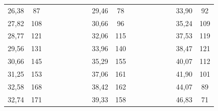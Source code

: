 \begin{enumerate}
\begin{table}[h!]
{\begin{tabular}{|cc|cccccccccccccccc}
					\multicolumn{1}{|c|}{26,38}    & 87                &  &  &  &  &  & \multicolumn{1}{c|}{} & \multicolumn{1}{c|}{29,46}    & \multicolumn{1}{c|}{78}                &  &  &  &  &  & \multicolumn{1}{c|}{} & \multicolumn{1}{c|}{33,90}    & \multicolumn{1}{c|}{92}                \\ \cline{1-2} \cline{9-10} \cline{17-18} 
					\multicolumn{1}{|c|}{27,82}    & 108               &  &  &  &  &  & \multicolumn{1}{c|}{} & \multicolumn{1}{c|}{30,66}    & \multicolumn{1}{c|}{96}                &  &  &  &  &  & \multicolumn{1}{c|}{} & \multicolumn{1}{c|}{35,24}    & \multicolumn{1}{c|}{109}               \\ \cline{1-2} \cline{9-10} \cline{17-18} 
					\multicolumn{1}{|c|}{28,77}    & 121               &  &  &  &  &  & \multicolumn{1}{c|}{} & \multicolumn{1}{c|}{32,06}    & \multicolumn{1}{c|}{115}               &  &  &  &  &  & \multicolumn{1}{c|}{} & \multicolumn{1}{c|}{37,53}    & \multicolumn{1}{c|}{119}               \\ \cline{1-2} \cline{9-10} \cline{17-18} 
					\multicolumn{1}{|c|}{29,56}    & 131               &  &  &  &  &  & \multicolumn{1}{c|}{} & \multicolumn{1}{c|}{33,96}    & \multicolumn{1}{c|}{140}               &  &  &  &  &  & \multicolumn{1}{c|}{} & \multicolumn{1}{c|}{38,47}    & \multicolumn{1}{c|}{121}               \\ \cline{1-2} \cline{9-10} \cline{17-18} 
					\multicolumn{1}{|c|}{30,66}    & 145               &  &  &  &  &  & \multicolumn{1}{c|}{} & \multicolumn{1}{c|}{35,29}    & \multicolumn{1}{c|}{155}               &  &  &  &  &  & \multicolumn{1}{c|}{} & \multicolumn{1}{c|}{40,07}    & \multicolumn{1}{c|}{112}               \\ \cline{1-2} \cline{9-10} \cline{17-18} 
					\multicolumn{1}{|c|}{31,25}    & 153               &  &  &  &  &  & \multicolumn{1}{c|}{} & \multicolumn{1}{c|}{37,06}    & \multicolumn{1}{c|}{161}               &  &  &  &  &  & \multicolumn{1}{c|}{} & \multicolumn{1}{c|}{41,90}    & \multicolumn{1}{c|}{101}               \\ \cline{1-2} \cline{9-10} \cline{17-18} 
					\multicolumn{1}{|c|}{32,58}    & 168               &  &  &  &  &  & \multicolumn{1}{c|}{} & \multicolumn{1}{c|}{38,42}    & \multicolumn{1}{c|}{162}               &  &  &  &  &  & \multicolumn{1}{c|}{} & \multicolumn{1}{c|}{44,07}    & \multicolumn{1}{c|}{89}                \\ \cline{1-2} \cline{9-10} \cline{17-18} 
					\multicolumn{1}{|c|}{32,74}    & 171               &  &  &  &  &  & \multicolumn{1}{c|}{} & \multicolumn{1}{c|}{39,33}    & \multicolumn{1}{c|}{158}               &  &  &  &  &  & \multicolumn{1}{c|}{} & \multicolumn{1}{c|}{46,83}    & \multicolumn{1}{c|}{71}                \\ \cline{1-2} \cline{9-10} \cline{17-18} 

\end{tabular}}
\end{table}
\end{enumerate}
